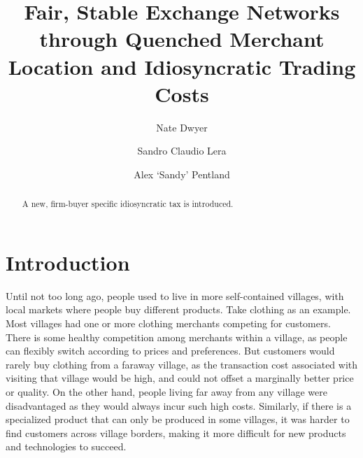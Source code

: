 \documentclass[final,3p,times,authoryear,12pt]{elsarticle}
\begin{document}
\begin{frontmatter}

\title{Fair, Stable Exchange Networks through Quenched Merchant Location and Idiosyncratic Trading Costs}

\author[add1]{Nate Dwyer}

\author[add1]{Sandro Claudio Lera}

\author[add1]{Alex `Sandy' Pentland}

\address[add1]{\scriptsize The Media Lab, Massachusetts Institute of Technology, 77 Massachusetts Avenue, 02139 Cambridge, Massachusetts, USA}

\begin{abstract} 
A new, firm-buyer specific idiosyncratic tax is introduced.
\end{abstract}

\end{frontmatter}


\section{Introduction}

Until not too long ago, people used to live in more self-contained villages,
with local markets where people buy different products.  Take clothing as an
example. Most villages had one or more clothing merchants competing for
customers.  There is some healthy competition among merchants within a village,
as people can flexibly switch according to prices and preferences. But customers
would rarely buy clothing from a faraway village, as the transaction cost
associated with visiting that village would be high,  and could not offset a
marginally better price or quality.  On the other hand, people living far away
from any village were disadvantaged as they would always incur such high costs.
Similarly, if there is a specialized product that can only be produced in some
villages, it was harder to find customers across village borders, making it more
difficult for new products and technologies to succeed. 
\end{document}
